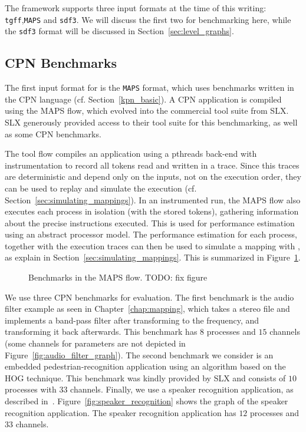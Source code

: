 The \mocasin framework supports three input formats at the time of this writing: \texttt{tgff},\texttt{MAPS} and \texttt{sdf3}.
We will discuss the first two for benchmarking here, while the \texttt{sdf3} format will be discussed in Section~\ref{sec:level_graphs}.

\subsection{CPN Benchmarks}

The first input format for \mocasin is the \texttt{MAPS} format, which uses benchmarks written in the \ac{CPN} language (cf. Section~\ref{kpn_basic}).
A \ac{CPN} application is compiled using the \ac{MAPS} flow, which evolved into the commercial tool suite from SLX.
SLX generously provided access to their tool suite for this benchmarking, as well as some \ac{CPN} benchmarks. 

The tool flow compiles an application using a \acp{pthread} back-end with instrumentation to record all tokens read and written in a trace.
Since this traces are deterministic and depend only on the inputs, not on the execution order, they can be used to replay and simulate the execution (cf. Section~\ref{sec:simulating_mappings}).
In an instrumented run, the \ac{MAPS} flow also executes each process in isolation (with the stored tokens), gathering information about the precise instructions executed.
This is used for performance estimation using an abstract processor model\cite{eusse2014pre}.
The performance estimation for each process, together with the execution traces can then be used to simulate a mapping with \mocasin, as explain in Section~\ref{sec:simulating_mappings}.
This is summarized in Figure~\ref{fig:maps_flow}.

\begin{figure}[h]
	\centering
\resizebox{0.8\textwidth}{!}{
   \begin{tikzpicture}
     
   \end{tikzpicture}
 }
   \caption{Benchmarks in the \ac{MAPS} flow. TODO: fix figure}
   \label{fig:maps_flow}
\end{figure}


We use three \ac{CPN} benchmarks for evaluation.
The first benchmark is the audio filter example as seen in Chapter~\ref{chap:mapping}, which takes a stereo file and implements a band-pass filter after transforming to the frequency, and transforming it back afterwards.
This benchmark has $8$ processes and $15$ channels (some channels for parameters are not depicted in Figure~\ref{fig:audio_filter_graph}).
The second benchmark we consider is an embedded pedestrian-recognition application using an algorithm based on the \ac{HOG} technique.
This benchmark was kindly provided by SLX and consists of $10$ processes with $33$ channels.
Finally, we use a speaker recognition application, as described in~\cite{bouraoui2019comparing}.
Figure~\ref{fig:speaker_recognition} shows the graph of the speaker recognition application. 
The speaker recognition application has $12$ processes and $33$ channels.

